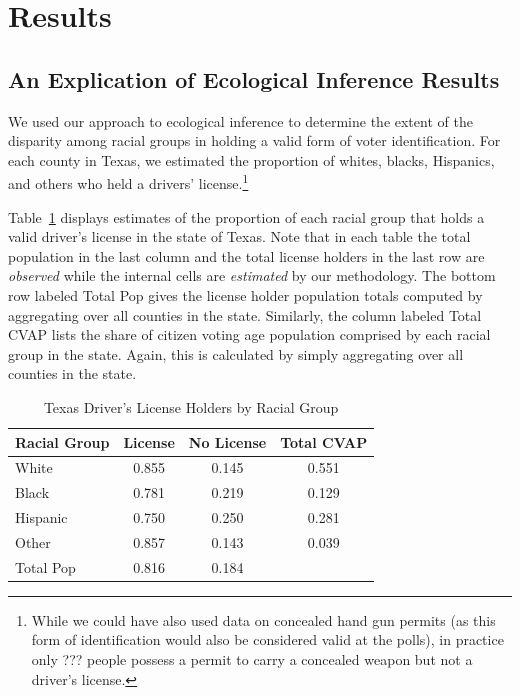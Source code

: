 \documentclass[12pt]{article}
\begin{document}
\section{Results}\label{s:res}

\subsection{An Explication of Ecological Inference Results}

We used our approach to ecological inference to determine the extent
of the disparity among racial groups in holding a valid form of voter identification. For each
county in Texas, we estimated the proportion of whites, blacks, Hispanics,
and others who held a drivers' license.\footnote{While we could have also used data on concealed hand gun permits
(as this form of identification would also be considered valid at the polls), in practice only ??? people possess a permit to carry a concealed weapon but not a driver's license.} 

Table~\ref{cvap_f3_ex} displays estimates of the proportion of
each racial group that holds a valid driver's license in the state of Texas. Note that in each
table the total population in the last column and the total license holders in
the last row are {\it observed} while the internal cells are {\it estimated} 
by our methodology. The bottom row labeled Total Pop
gives the license holder population totals computed by aggregating over all counties in the state. 
Similarly, the column labeled Total CVAP lists the
share of citizen voting age population comprised by each racial group
in the state.  Again, this is calculated by simply aggregating over
all counties in the state.

\begin{table}[ht]
\begin{center}
\caption{\label{cvap_f3_ex}Texas Driver's License Holders by Racial Group}
\begin{tabular}{lccc}
  \hline
Racial Group & License & No License & Total CVAP\\
  \hline
White & 0.855 & 0.145 & 0.551 \\ 
Black & 0.781 & 0.219 & 0.129 \\ 
Hispanic & 0.750 & 0.250 & 0.281 \\ 
Other & 0.857 & 0.143 & 0.039 \\ 
Total Pop & 0.816 & 0.184 &   \\ 
   \hline

\end{tabular}
\end{center}
\end{table}
\end{document}
